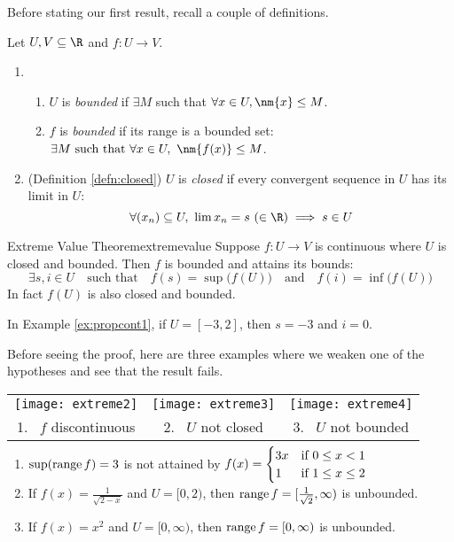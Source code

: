	Before stating our first result, recall a couple of definitions.

\begin{defn}{}{}
Let $U,V\subseteq\R$ and $f:U\to V$.
	\begin{enumerate}
	  \item\begin{enumerate}
	    \item $U$ is \emph{bounded} if $\exists M$ such that $\forall x\in U, \nm{x}\le M$.
	    \item $f$ is \emph{bounded} if its range is a bounded set: $\exists M\text{ such that }\forall x\in U,\ \nm{f(x)}\le M$.
	  \end{enumerate}
	  \item (Definition \ref{defn:closed}) $U$ is \emph{closed} if every convergent sequence in $U$ has its limit in $U$:
		\[\forall (x_n)\subseteq U,\ \lim x_n=s\ (\in\R)\implies s\in U\]
	\end{enumerate}
\end{defn}

\begin{thm}{Extreme Value Theorem}{extremevalue}
	Suppose $f:U\to V$ is continuous where $U$ is closed and bounded. Then $f$ is bounded and attains its bounds: %
	\[
		\exists s,i\in U\quad \text{such that}\quad f(s)=\sup\bigl(f(U)\bigr)\quad\text{and}\quad	f(i)=\inf\bigl(f(U)\bigr)
	\]
	In fact $f(U)$ is also closed and bounded.
\end{thm}

In Example \ref{ex:propcont1}, if $U=[-3,2]$, then $s=-3$ and $i=0$.

\begin{examples}{}{}
	Before seeing the proof, here are three examples where we weaken one of the hypotheses and see that the result fails.
	\begin{center}
	\begin{tabular}{c@{\qquad}c@{\qquad}c}
		\texttt{[image: extreme2]}
		&
		\texttt{[image: extreme3]}
		&
		\texttt{[image: extreme4]}
		\\
		1. \ $f$ discontinuous
		&
		2. \ $U$ not closed
		&
		3. \ $U$ not bounded	
	\end{tabular}
	\end{center}
	\smallskip
	
	\begin{enumerate}
	  \item $\sup(\operatorname{range} f)=3$ is not attained by $f(x) =\smash{\begin{cases}
	  3x&\text{if }0\le x<1\\
	  1&\text{if }1\le x\le 2
	  \end{cases}}$\smallskip
	  \item If $f(x)=\frac 1{\sqrt{2-x}}$ and $U=[0,2)$, then $\operatorname{range} f=[\frac 1{\sqrt 2},\infty)$ is unbounded.
	  \item If $f(x)=x^2$ and $U=[0,\infty)$, then $\operatorname{range} f=[0,\infty)$ is unbounded.
	\end{enumerate}
\end{examples}

